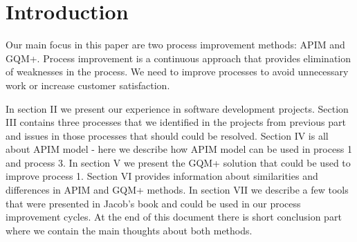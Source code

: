 \section{Introduction}
Our main focus in this paper are two process improvement methods: APIM and GQM+. Process improvement is a continuous approach that provides elimination of weaknesses in the process. We need to improve processes to avoid unnecessary work or increase customer satisfaction. 

In section II we present our experience in software development projects. Section III contains three processes that we identified in the projects from previous part and issues in those processes that should could be resolved. Section IV is all about APIM model - here we describe how APIM model can be used in process 1 and process 3. In section V we present the GQM+ solution that could be used to improve process 1. Section VI provides information about similarities and differences in APIM and GQM+ methods. In section VII we describe a few tools that were presented in Jacob's book \cite{jacobs} and could be used in our process improvement cycles. At the end of this document there is short conclusion part where we contain the main thoughts about both methods.
